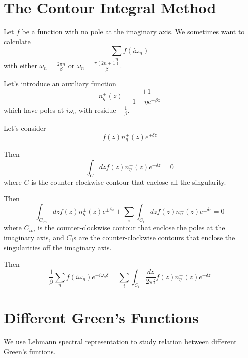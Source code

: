 \documentclass[12pt]{book}
\begin{document}
	\section{The Contour Integral Method}
	
	Let $f$ be a function with no pole at the imaginary axis. We sometimes want to calculate
	\begin{equation}
		\sum_n f(i\omega_n)
	\end{equation}
	with either $\omega_n=\frac{2\pi n}\beta$ or $\omega_n=\frac{\pi(2n+1)}\beta$.
	
	Let's introduce an auxiliary function
	\begin{equation}
		n^\pm_\eta(z)=\frac {\pm1}{1+\eta e^{\pm\beta z}}
	\end{equation}
	which have poles at $i\omega_n$ with residue $-\frac 1\beta$.
	
	Let's consider
	\begin{equation}
		f(z)n^\pm_\eta(z)e^{\pm\delta z}
	\end{equation}
	
	Then
	\begin{equation}
		\int_C dzf(z)n^\pm_\eta(z)e^{\pm\delta z}=0
	\end{equation}
	where $C$ is the counter-clockwise contour that enclose all the singularity.
	
	Then
	\begin{equation}
		\int_{C_{im}} dzf(z)n^\pm_\eta(z)e^{\pm\delta z}+\sum_i\int_{C_i} dzf(z)n^\pm_\eta(z)e^{\pm\delta z}=0
	\end{equation}
	where $C_{im}$ is the counter-clockwise contour that enclose the poles at the imaginary axis, and $C_i$s are the counter-clockwise contours that enclose the singularities off the imaginary axis.
	
	Then
	\begin{equation}
		\frac 1\beta\sum_n f(i\omega_n)e^{\pm i\omega_n\delta}=\sum_i\int_{C_i} \frac{dz}{2\pi i}f(z)n^\pm_\eta(z)e^{\pm\delta z}
	\end{equation}
	\section{Different Green's Functions}
	\label{sec:greens_finiteT}
	We use Lehmann spectral representation to study relation between different Green's funtions.
\end{document}
